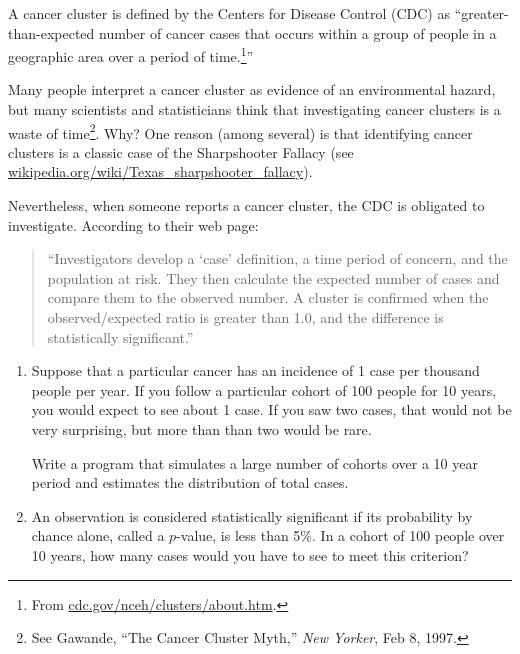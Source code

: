 \documentclass[12pt]{book}
\begin{document}
\begin{exercise}
A cancer cluster is defined by the Centers for Disease Control (CDC)
as ``greater-than-expected number of cancer cases that occurs within a
group of people in a geographic area over a period of
time.\footnote{From \url{cdc.gov/nceh/clusters/about.htm}.}''



Many people interpret a cancer cluster as evidence of an environmental
hazard, but many scientists and statisticians think that investigating
cancer clusters is a waste of time\footnote{See Gawande, ``The Cancer
  Cluster Myth,'' {\em New Yorker}, Feb 8, 1997.}.  Why?  One reason
(among several) is that identifying cancer clusters is a classic case
of the Sharpshooter Fallacy (see
\url{wikipedia.org/wiki/Texas_sharpshooter_fallacy}).


Nevertheless, when someone reports a cancer cluster, the CDC is
obligated to investigate.  According to their web page:

\begin{quote}

``Investigators develop a `case' definition, a time period of concern,
  and the population at risk. They then calculate the expected number
  of cases and compare them to the observed number. A cluster is
  confirmed when the observed/expected ratio is greater than 1.0, and
  the difference is statistically significant.''

\end{quote}

\begin{enumerate}


\item Suppose that a particular cancer has an incidence of 1 case per
  thousand people per year.  If you follow a particular cohort of 100
  people for 10 years, you would expect to see about 1 case.  If you
  saw two cases, that would not be very surprising, but more than than
  two would be rare.

Write a program that simulates a large number of cohorts over
a 10 year period and estimates the distribution of total cases.

\item An observation is considered statistically significant if its
  probability by chance alone, called a $p$-value, is less than 5\%.
  In a cohort of 100 people over 10 years, how many cases would you
  have to see to meet this criterion?


\end{enumerate}
\end{exercise}
\end{document}
